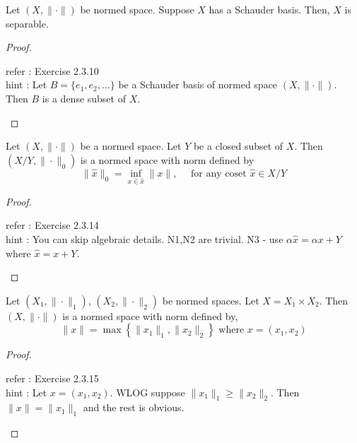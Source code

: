 \begin{lemma}[separable]
	Let $(X,\|\cdot\|)$ be normed space.
	Suppose $X$ has a Schauder basis.
	Then, $X$ is separable.
\end{lemma}
\begin{proof}
\begin{important}
	refer : Exercise 2.3.10\\
	hint : Let $B = \{ e_1,e_2, \dotsc \}$ be a Schauder basis of normed space $(X,\|\cdot\|)$. Then $B$ is a dense subset of $X$.
\end{important}
\end{proof}

\begin{lemma}
	Let $(X,\| \cdot \|)$ be a normed space.
	Let $Y$ be a closed subset of $X$.
	Then $(X/Y,\|\cdot\|_0)$ is a normed space with norm defined by
	\[ \|\hat{x}\|_0 = \inf_{x \in \hat{x}} \| x \|, \quad \text{ for any coset } \hat{x} \in X/Y \]
\end{lemma}
\begin{proof}
\begin{important}
	refer : Exercise 2.3.14\\
	hint : You can skip algebraic details. N1,N2 are trivial. N3 - use $\alpha \hat{x} = \alpha x + Y$ where $\hat{x} = x+Y$.
\end{important}
\end{proof}
\begin{lemma}
	Let $(X_1,\|\cdot\|_1)$, $(X_2,\|\cdot\|_2)$ be normed spaces.
	Let $X = X_1 \times X_2$.
	Then $(X,\|\cdot\|)$ is a normed space with norm defined by,
	\[ \| x \| = \max \left\{ \|x_1\|_1,\|x_2\|_2 \right\} \text{ where } x = (x_1,x_2) \]
\end{lemma}
\begin{proof}
\begin{important}
	refer : Exercise 2.3.15\\
	hint : Let $x = (x_1,x_2)$. WLOG suppose $\|x_1\|_1 \ge \|x_2\|_2$. Then $\| x \| = \| x_1 \|_1$ and the rest is obvious.
\end{important}
\end{proof}

